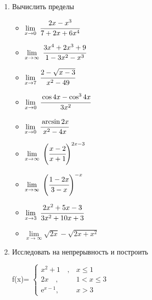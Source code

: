 \documentclass{article}
\begin{document}
\begin{multicols}{2}
	\begin{enumerate}[label=\arabic*.]
		\item Вычислить пределы
		\begin{multicols}{3}
			\begin{itemize}[label=""]
				\item $\lim\limits_{x \to 0}\ \cfrac{2x - x^3}{7+2x+6x^4}$
				\item $\lim\limits_{x \to \infty}\ \cfrac{3x^4 + 2x^3 + 9}{1-3x^2-x^3}$
				\item $\lim\limits_{x \to 7}\ \cfrac{2-\sqrt{x-3}}{x^2-49}$
				\vfill\null\columnbreak
				\item $\lim\limits_{x \to 0}\ \cfrac{\cos 4x - \cos^3 4x}{3x^2}$
				\item $\lim\limits_{x \to 0}\ \cfrac{\arcsin 2x}{x^2-4x}$
				\item $\lim\limits_{x \to \infty}\ \Bigg(\cfrac{x-2}{x+1}\Bigg)^{2x-3}$
				\vfill\null\columnbreak
				\item $\lim\limits_{x \to \infty}\ \Bigg(\cfrac{1-2x}{3-x}\Bigg)^{-x}$
				\item $\lim\limits_{x \to 3}\ \cfrac{2x^2+5x-3}{3x^2+10x+3}$
				\item $\lim\limits_{x \to \infty} \sqrt{2x}-\sqrt{2x+x^2}$
				\vfill\null\columnbreak
			\end{itemize}
		\end{multicols}
		\vspace{-5mm}
		\item Исследовать на непрерывность и построить
		\begin{multicols}{3}
			f(x)=
			$\begin{cases}
			x^2 + 1 \quad, & x \leq 1\\
			2x \quad, & 1 < x \leq 3 \\
			\mbox{e}^{x-1}, & x > 3
			\end{cases}$
			\vfill\null\columnbreak
			\vfill\null\columnbreak
		\end{multicols}
		

\end{enumerate}
\end{multicols}
\end{document}
